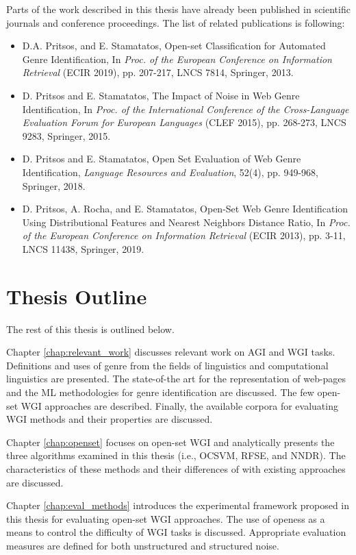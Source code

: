 \begin{itemize}
Parts of the work described in this thesis have already been published in scientific journals and conference proceedings. The list of related publications is following:

\begin{itemize}
\item D.A. Pritsos, and E. Stamatatos, Open-set Classification for Automated Genre Identification, In \textit{Proc. of the European Conference on Information Retrieval} (ECIR 2019), pp. 207-217, LNCS 7814, Springer, 2013.
\item D. Pritsos and E. Stamatatos, The Impact of Noise in Web Genre Identification, In \textit{Proc. of the International Conference of the Cross-Language Evaluation Forum for European Languages} (CLEF 2015), pp. 268-273, LNCS  9283, Springer, 2015.
\item D. Pritsos and E. Stamatatos, Open Set Evaluation of Web Genre Identification, \textit{Language Resources and Evaluation}, 52(4), pp. 949-968, Springer, 2018.
\item D. Pritsos, A. Rocha, and E. Stamatatos, Open-Set Web Genre Identification Using Distributional Features and Nearest Neighbors Distance Ratio, In \textit{Proc. of the European Conference on Information Retrieval} (ECIR 2013), pp. 3-11, LNCS 11438, Springer, 2019.
\end{itemize}

\section{Thesis Outline} \label{chap:Introduction:sec:thesis_outline}

The rest of this thesis is outlined below. 

Chapter \ref{chap:relevant_work} discusses relevant work on AGI and WGI tasks. Definitions and uses of genre from the fields of linguistics and computational linguistics are presented. The state-of-the art for the representation of web-pages and the ML methodologies for genre identification are discussed. The few open-set WGI approaches are described. Finally, the available corpora for evaluating WGI methods and their properties are discussed.

Chapter \ref{chap:openset} focuses on open-set WGI and analytically presents the three algorithms examined in this thesis (i.e., OCSVM, RFSE, and NNDR). The characteristics of these methods and their differences of with existing approaches are discussed.

Chapter \ref{chap:eval_methods} introduces the experimental framework proposed in this thesis for evaluating open-set WGI approaches. The use of openess as a means to control the difficulty of WGI tasks is discussed. Appropriate evaluation measures are defined for both unstructured and structured noise. 


\end{itemize}
